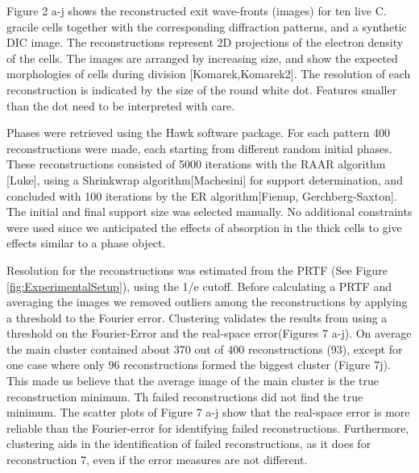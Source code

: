 Figure 2 a-j shows the reconstructed exit wave-fronts (images) for ten live C. gracile cells together with the corresponding diffraction patterns, and a synthetic DIC image. The reconstructions represent 2D projections of the electron density of the cells. The images are arranged by increasing size, and show the expected morphologies of cells during division [Komarek,Komarek2]. The resolution of each  reconstruction is indicated by the size of the round white dot. Features smaller than the dot need to be interpreted with care.

Phases were retrieved using the Hawk software package. For each pattern 400 reconstructions were made, each starting from different random initial phases. These reconstructions consisted of 5000 iterations with the RAAR algorithm [Luke], using a Shrinkwrap algorithm[Machesini] for support determination, and concluded with 100 iterations by the ER algorithm[Fienup, Gerchberg-Saxton]. The initial and final support size was selected manually. No additional constraints were used since we anticipated the effects of absorption in the thick cells to give effects similar to a phase object. 

Resolution for the reconstructions was estimated from the PRTF (See Figure \ref{fig:ExperimentalSetup}), using the 1/e cutoff. Before calculating a PRTF and averaging the images we removed outliers among the reconstructions by applying a threshold to the Fourier error. Clustering validates the results from using a threshold on the Fourier-Error and the real-space error(Figures 7 a-j). On average the main cluster contained about 370 out of 400 reconstructions (93), except for one case where only 96 reconstructions formed the biggest cluster (Figure 7j). This made us believe that the average image of the main cluster is the true reconstruction minimum. Th failed reconstructions did not find the true minimum.
The scatter plots of Figure 7 a-j show that the real-space error is more reliable than the Fourier-error for identifying failed reconstructions. Furthermore, clustering aids in the identification of failed reconstructions, as it does for reconstruction 7, even if the error measures are not different. 


